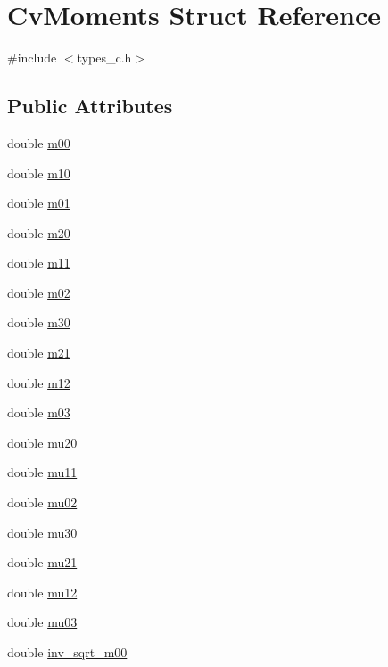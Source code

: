 \hypertarget{structCvMoments}{\section{Cv\-Moments Struct Reference}
\label{structCvMoments}
}


{\ttfamily \#include $<$types\-\_\-c.\-h$>$}

\subsection*{Public Attributes}
\begin{DoxyCompactItemize}
\item 
double \hyperlink{structCvMoments_af8990a23161b5e58cf5823a1ea824b58}{m00}
\item 
double \hyperlink{structCvMoments_a2ecba768610f42190605fb63f63bc12e}{m10}
\item 
double \hyperlink{structCvMoments_a7ebd6af845050990ceda665a685e95c4}{m01}
\item 
double \hyperlink{structCvMoments_a8ba6f3f8d0fba50aa5c5a06ece09904a}{m20}
\item 
double \hyperlink{structCvMoments_a6ad25d9398f6bc1a69abb1568286847b}{m11}
\item 
double \hyperlink{structCvMoments_ad6733062576919dac6c2c7f1d6f55fbd}{m02}
\item 
double \hyperlink{structCvMoments_a06450b2c72eeac634462622edf33e905}{m30}
\item 
double \hyperlink{structCvMoments_ab02c25185eeb6943c6544526fdd6ed00}{m21}
\item 
double \hyperlink{structCvMoments_a7e7a320f1c3061d2f282ef2183a9044f}{m12}
\item 
double \hyperlink{structCvMoments_a5da611e29d5c86cb34cfc99a288fb60d}{m03}
\item 
double \hyperlink{structCvMoments_aa20e267058657184b5ca4c5491c12e10}{mu20}
\item 
double \hyperlink{structCvMoments_a029e8765b2dabc92ced26c18ae7f6439}{mu11}
\item 
double \hyperlink{structCvMoments_add6e9dfde50187ed89c48114e7106fba}{mu02}
\item 
double \hyperlink{structCvMoments_a8c4cfe0c724576018e73b2ec7a724470}{mu30}
\item 
double \hyperlink{structCvMoments_a429d624a00bc859472d13a68ce073f85}{mu21}
\item 
double \hyperlink{structCvMoments_a339627399f6f3a6d10a7ae2a38d2a8ea}{mu12}
\item 
double \hyperlink{structCvMoments_a4bc33c2f551d6a3e847eb1c1863e6e60}{mu03}
\item 
double \hyperlink{structCvMoments_ad08a81f43610187c2e0c430cb13f24ae}{inv\-\_\-sqrt\-\_\-m00}
\end{DoxyCompactItemize}


